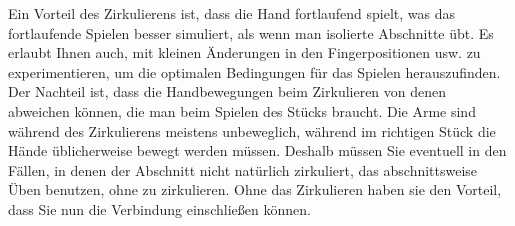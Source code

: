 Ein Vorteil des Zirkulierens ist, dass die Hand fortlaufend spielt, was das fortlaufende Spielen besser simuliert, als wenn man isolierte Abschnitte übt.
Es erlaubt Ihnen auch, mit kleinen Änderungen in den Fingerpositionen usw. zu experimentieren, um die optimalen Bedingungen für das Spielen herauszufinden.
Der Nachteil ist, dass die Handbewegungen beim Zirkulieren von denen abweichen können, die man beim Spielen des Stücks braucht.
Die Arme sind während des Zirkulierens meistens unbeweglich, während im richtigen Stück die Hände üblicherweise bewegt werden müssen.
Deshalb müssen Sie eventuell in den Fällen, in denen der Abschnitt nicht natürlich zirkuliert, das abschnittsweise Üben benutzen, ohne zu zirkulieren.
Ohne das Zirkulieren haben sie den Vorteil, dass Sie nun die Verbindung einschließen können.



